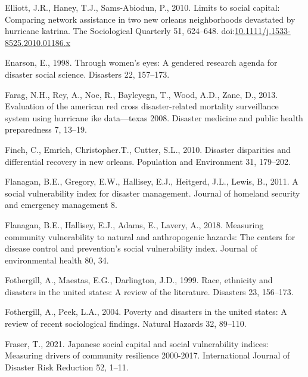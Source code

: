 \documentclass[]{elsarticle} %
\newlength{\cslhangindent}
\newlength{\cslentryspacingunit} %
\newenvironment{CSLReferences}[2] %
 {%
  \setlength{\parindent}{0pt}
  \ifodd #1
  \let\oldpar\par
  \def\par{\hangindent=\cslhangindent\oldpar}
  \fi
  \setlength{\parskip}{#2\cslentryspacingunit}
 }%
 {}
\begin{document}
\begin{CSLReferences}{1}{0}
\leavevmode{}%
Elliott, J.R., Haney, T.J., Sams-Abiodun, P., 2010. Limits to social
capital: Comparing network assistance in two new orleans neighborhoods
devastated by hurricane katrina. The Sociological Quarterly 51,
624--648.
doi:\href{https://doi.org/10.1111/j.1533-8525.2010.01186.x}{10.1111/j.1533-8525.2010.01186.x}

\leavevmode{}%
Enarson, E., 1998. Through women's eyes: A gendered research agenda for
disaster social science. Disasters 22, 157--173.

\leavevmode{}%
Farag, N.H., Rey, A., Noe, R., Bayleyegn, T., Wood, A.D., Zane, D.,
2013. Evaluation of the american red cross disaster-related mortality
surveillance system using hurricane ike data---texas 2008. Disaster
medicine and public health preparedness 7, 13--19.

\leavevmode{}%
Finch, C., Emrich, Christopher.T., Cutter, S.L., 2010. Disaster
disparities and differential recovery in new orleans. Population and
Environment 31, 179--202.

\leavevmode{}%
Flanagan, B.E., Gregory, E.W., Hallisey, E.J., Heitgerd, J.L., Lewis,
B., 2011. A social vulnerability index for disaster management. Journal
of homeland security and emergency management 8.

\leavevmode{}%
Flanagan, B.E., Hallisey, E.J., Adams, E., Lavery, A., 2018. Measuring
community vulnerability to natural and anthropogenic hazards: The
centers for disease control and prevention's social vulnerability index.
Journal of environmental health 80, 34.

\leavevmode{}%
Fothergill, A., Maestas, E.G., Darlington, J.D., 1999. Race, ethnicity
and disasters in the united states: A review of the literature.
Disasters 23, 156--173.

\leavevmode{}%
Fothergill, A., Peek, L.A., 2004. Poverty and disasters in the united
states: A review of recent sociological findings. Natural Hazards 32,
89--110.

\leavevmode{}%
Fraser, T., 2021. Japanese social capital and social vulnerability
indices: Measuring drivers of community resilience 2000-2017.
International Journal of Disaster Risk Reduction 52, 1--11.


\end{CSLReferences}
\end{document}
